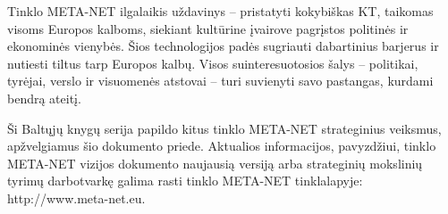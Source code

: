 \documentclass[]{../metanetpaper}
\begin{document}
\begin{multicols}{2}
Tinklo META-NET ilgalaikis uždavinys – pristatyti kokybiškas KT, taikomas visoms Europos kalboms, siekiant kultūrine įvairove pagrįstos politinės ir ekonominės vienybės. Šios technologijos padės sugriauti dabartinius barjerus ir nutiesti tiltus tarp Europos kalbų. Visos suinteresuotosios šalys – politikai, tyrėjai, verslo ir visuomenės atstovai – turi suvienyti savo pastangas, kurdami bendrą ateitį.

Ši Baltųjų knygų serija papildo kitus tinklo META-NET strateginius veiksmus, apžvelgiamus šio dokumento priede. Aktualios informacijos, pavyzdžiui, tinklo META-NET vizijos dokumento naujausią versiją \cite{Meta1} arba strateginių mokslinių tyrimų darbotvarkę galima rasti tinklo META-NET tinklalapyje: http://www.meta-net.eu.
\end{multicols}

\clearpage


\end{document}
